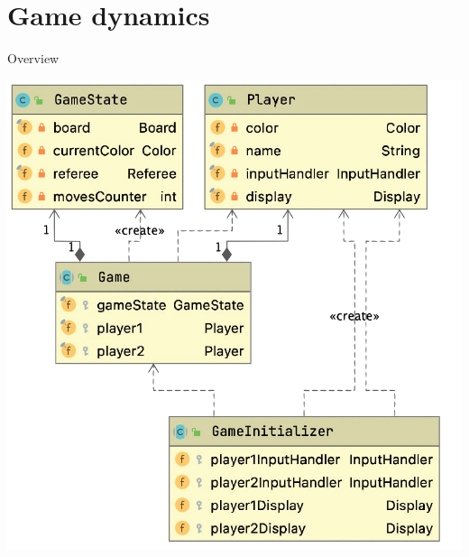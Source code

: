\documentclass{beamer}
\begin{document}
\section{Game dynamics}

\begin{frame}{Overview}
	  \begin{center}
     		\includegraphics[scale=0.25]{images/game_uml.png}
     	\end{center}

\end{frame}
\end{document}
